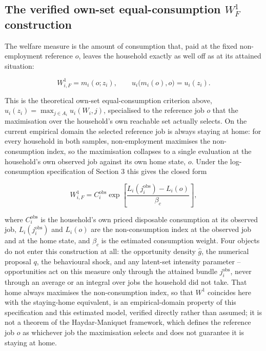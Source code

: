 \documentclass[11pt,a4paper]{article}
\begin{document}
\subsection{\texorpdfstring{The verified own-set equal-consumption \(W^1_F\) construction}{The verified own-set equal-consumption W\^{}1\_F construction}}\label{the-verified-own-set-equal-consumption-w1_f-construction}

The welfare measure is the amount of consumption that, paid at the fixed non-employment reference \(o\), leaves the household exactly as well off as at its attained situation:

\[
W^1_{i,F}=m_i(o;z_i), \qquad u_i\big(m_i(o),o\big)=u_i(z_i).
\]

This is the theoretical own-set equal-consumption criterion above, \(u_i(z_i)=\max_{j\in A_i}u_i(W_i,j)\), specialised to the reference job \(o\) that the maximisation over the household's own reachable set actually selects. On the current empirical domain the selected reference job is always staying at home: for every household in both samples, non-employment maximises the non-consumption index, so the maximisation collapses to a single evaluation at the household's own observed job against its own home state, \(o\). Under the log-consumption specification of Section 3 this gives the closed form

\[
\boxed{\;W^1_{i,F}=C_i^{\mathrm{obs}}\exp\!\left[\frac{L_i(j_i^{\mathrm{obs}})-L_i(o)}{\beta_c}\right],\;}
\]

where \(C_i^{\mathrm{obs}}\) is the household's own priced disposable consumption at its observed job, \(L_i(j_i^{\mathrm{obs}})\) and \(L_i(o)\) are the non-consumption index at the observed job and at the home state, and \(\beta_c\) is the estimated consumption weight. Four objects do not enter this construction at all: the opportunity density \(\widehat g\), the numerical proposal \(q\), the behavioural shock, and any latent-set intensity parameter -- opportunities act on this measure only through the attained bundle \(j_i^{\mathrm{obs}}\), never through an average or an integral over jobs the household did not take. That home always maximises the non-consumption index, so that \(W^1\) coincides here with the staying-home equivalent, is an empirical-domain property of this specification and this estimated model, verified directly rather than assumed; it is not a theorem of the Haydar-Maniquet framework, which defines the reference job \(o\) as whichever job the maximisation selects and does not guarantee it is staying at home.
\end{document}
